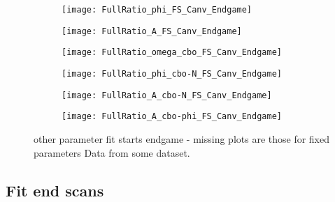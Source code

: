 \begin{figure}[]
\centering
    \begin{subfigure}[]{0.45\textwidth}
        \centering
        \texttt{[image: FullRatio\_phi\_FS\_Canv\_Endgame]}
        \caption{}
    \end{subfigure}%
    \begin{subfigure}[]{0.45\textwidth}
        \centering
        \texttt{[image: FullRatio\_A\_FS\_Canv\_Endgame]}
        \caption{}
    \end{subfigure}

    \begin{subfigure}[]{0.45\textwidth}
        \centering
        \texttt{[image: FullRatio\_omega\_cbo\_FS\_Canv\_Endgame]}
        \caption{}
    \end{subfigure}%
    \begin{subfigure}[]{0.45\textwidth}
        \centering
        \texttt{[image: FullRatio\_phi\_cbo-N\_FS\_Canv\_Endgame]}
        \caption{}
    \end{subfigure}

    \begin{subfigure}[]{0.45\textwidth}
        \centering
        \texttt{[image: FullRatio\_A\_cbo-N\_FS\_Canv\_Endgame]}
        \caption{}
    \end{subfigure}%
    \begin{subfigure}[]{0.45\textwidth}
        \centering
        \texttt{[image: FullRatio\_A\_cbo-phi\_FS\_Canv\_Endgame]}
        \caption{}
    \end{subfigure}
\caption[]{other parameter fit starts endgame - missing plots are those for fixed parameters Data from some dataset.}
\label{fig:}
\end{figure}


\subsection{Fit end scans}


